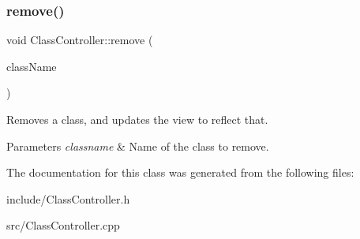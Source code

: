 \subsubsection{\texorpdfstring{remove()}{remove()}}
{\footnotesize\ttfamily void Class\+Controller\+::remove (\begin{DoxyParamCaption}\item[{const Q\+String \&}]{class\+Name }\end{DoxyParamCaption})}



Removes a class, and updates the view to reflect that. 


\begin{DoxyParams}{Parameters}
{\em classname} & Name of the class to remove. \\
\hline
\end{DoxyParams}


The documentation for this class was generated from the following files\+:\begin{DoxyCompactItemize}
\item 
include/Class\+Controller.\+h\item 
src/Class\+Controller.\+cpp\end{DoxyCompactItemize}
